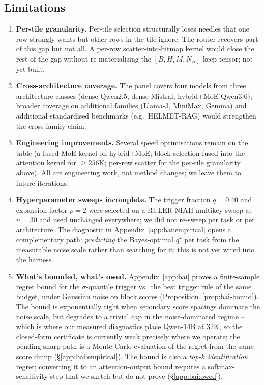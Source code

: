 \documentclass[11pt]{article}
\theoremstyle{remark}
\newcommand{\NB}{N_{\!B}}
\begin{document}
\subsection{Limitations}\label{sec:limits}

\begin{enumerate}[leftmargin=*,topsep=0.2em,itemsep=0.1em]
    \item \textbf{Per-tile granularity.} Per-tile selection structurally loses needles that one row strongly wants but other rows in the tile ignore. The router recovers part of this gap but not all. A per-row scatter-into-bitmap kernel would close the rest of the gap without re-materialising the $[B,H,M,\NB]$ keep tensor; not yet built.
    \item \textbf{Cross-architecture coverage.} The panel covers four models from three architecture classes (dense Qwen2.5, dense Mistral, hybrid+MoE Qwen3.6); broader coverage on additional families (Llama-3, MiniMax, Gemma) and additional standardised benchmarks (e.g.\ HELMET-RAG) would strengthen the cross-family claim.
    \item \textbf{Engineering improvements.} Several speed optimisations remain on the table (a fused MoE kernel on hybrid+MoE; block-selection fused into the attention kernel for $\ge 256$K; per-row scatter for the per-tile granularity above). All are engineering work, not method changes; we leave them to future iterations.
    \item \textbf{Hyperparameter sweeps incomplete.} The trigger fraction $q = 0.40$ and expansion factor $\rho = 2$ were selected on a RULER NIAH-multikey sweep at $n=30$ and used unchanged everywhere; we did not re-sweep per task or per architecture. The diagnostic in Appendix~\ref{app:bai:empirical} opens a complementary path: \emph{predicting} the Bayes-optimal $q^\star$ per task from the measurable noise scale rather than searching for it; this is not yet wired into the harness.
    \item \textbf{What's bounded, what's owed.} Appendix~\ref{app:bai} proves a finite-sample regret bound for the $\sigma$-quantile trigger vs.\ the best trigger rule of the same budget, under Gaussian noise on block scores (Proposition~\ref{prop:bai-bound}). The bound is exponentially tight when secondary score spacings dominate the noise scale, but degrades to a trivial cap in the noise-dominated regime -- which is where our measured diagnostics place Qwen-14B at 32K, so the closed-form certificate is currently weak precisely where we operate; the pending sharp path is a Monte-Carlo evaluation of the regret from the same score dump (\S\ref{app:bai:empirical}). The bound is also a \emph{top-$k$ identification} regret; converting it to an attention-output bound requires a softmax-sensitivity step that we sketch but do not prove (\S\ref{app:bai:owed}).
\end{enumerate}
\end{document}
